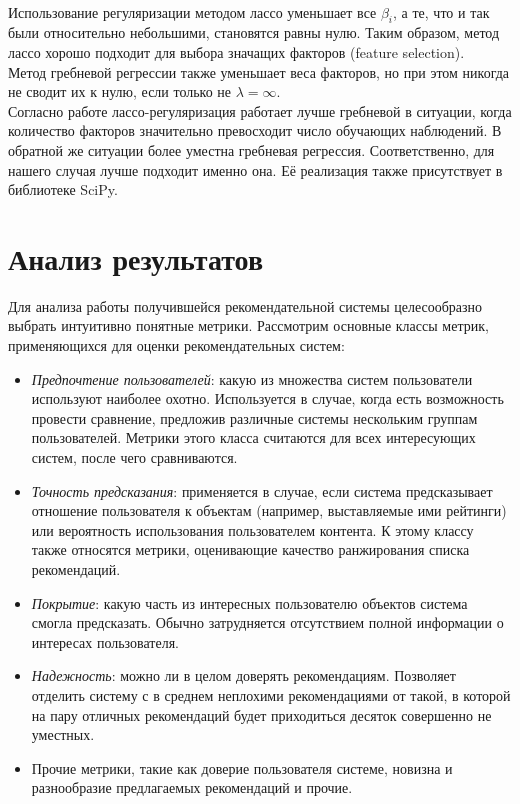 \documentclass[12pt]{article}
\begin{document}
\\\indent Использование регуляризации методом лассо уменьшает все $\beta_i$, а те, что и так были относительно небольшими, становятся равны нулю. Таким образом, метод лассо хорошо подходит для выбора значащих факторов (feature selection).  
\\\indent Метод гребневой регрессии также уменьшает веса факторов, но при этом никогда не сводит их к нулю, если только не $\lambda = \infty$.
\\\indent Согласно работе \cite{Ng04featureselection} лассо-регуляризация работает лучше гребневой в ситуации, когда количество факторов значительно превосходит число обучающих наблюдений. В обратной же ситуации более уместна гребневая регрессия. Соответственно, для нашего случая лучше подходит именно она. Её реализация также присутствует в библиотеке SciPy.


\section{Анализ результатов}
\indent Для анализа работы получившейся рекомендательной системы целесообразно выбрать интуитивно понятные метрики. Рассмотрим основные классы метрик, применяющихся для оценки рекомендательных систем\cite{rec_sys_handbook:evaluation}:
\begin{itemize}
    \item \textit{Предпочтение пользователей}: какую из множества систем пользователи используют наиболее охотно. Используется в случае, когда есть возможность провести сравнение, предложив различные системы нескольким группам пользователей. Метрики этого класса считаются для всех интересующих систем, после чего сравниваются.
    \item \textit{Точность предсказания}: применяется в случае, если система предсказывает отношение пользователя к объектам (например, выставляемые ими рейтинги) или вероятность использования пользователем контента. К этому классу также относятся метрики, оценивающие качество ранжирования списка рекомендаций.
    \item \textit{Покрытие}: какую часть из интересных пользователю объектов система смогла предсказать. Обычно затрудняется отсутствием полной информации о интересах пользователя.
    \item \textit{Надежность}: можно ли в целом доверять рекомендациям. Позволяет отделить систему с в среднем неплохими рекомендациями от такой, в которой на пару отличных рекомендаций будет приходиться десяток совершенно не уместных.
    \item Прочие метрики, такие как доверие пользователя системе, новизна и разнообразие предлагаемых рекомендаций и прочие.
\end{itemize}
\end{document}
